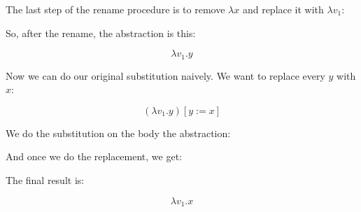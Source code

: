 \documentclass{book}
\numberwithin{equation}{chapter}
\begin{document}
\noindent
The last step of the rename procedure is to remove $\lambda x$ and replace it with $\lambda v_{1}$:

\begin{center}
\end{center}

\noindent
So, after the rename, the abstraction is this:

\begin{equation}
\lambda v_{1}.y
\end{equation}

\noindent
Now we can do our original substitution naively. We want to replace every $y$ with $x$:

\begin{equation}
(\lambda v_{1}.y)[y := x]
\end{equation}

\noindent
We do the substitution on the body the abstraction:

\begin{center}
\end{center}

\noindent
And once we do the replacement, we get:

\begin{center}
\end{center}

\noindent
The final result is:

\begin{equation}
\lambda v_{1}.x
\end{equation}
\end{document}
